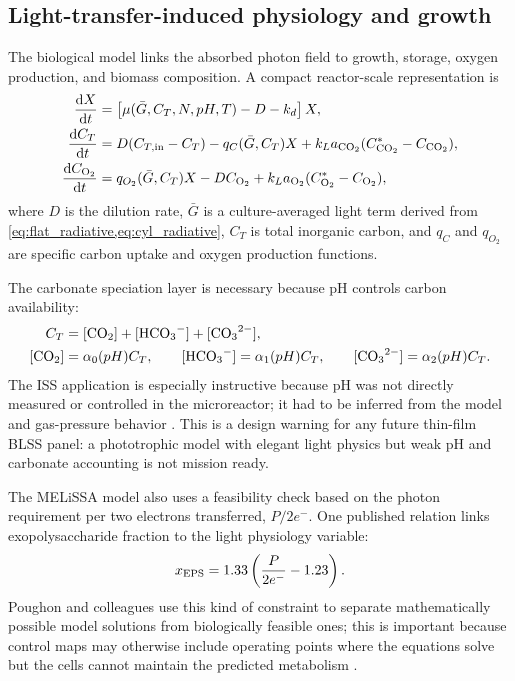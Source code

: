 \documentclass[11pt]{article}
\newcommand{\MEL}{MELiSSA}
\newcommand{\dd}{\mathrm{d}}
\begin{document}
\subsection{Light-transfer-induced physiology and growth}

The biological model links the absorbed photon field to growth, storage, oxygen production, and biomass composition. A compact reactor-scale representation is
\begin{align}
  \frac{\dd X}{\dd t} &= \left[\mu(\bar G,C_T,N,pH,T)-D-k_d\right]X,\label{eq:c4a_biomass}\\
  \frac{\dd C_T}{\dd t} &=D(C_{T,\rm in}-C_T)-q_C(\bar G,C_T)X+k_La_{\ce{CO2}}(C^*_{\ce{CO2}}-C_{\ce{CO2}}),\label{eq:c4a_carbon}\\
  \frac{\dd C_{\ce{O2}}}{\dd t} &=q_{O_2}(\bar G,C_T)X-D C_{\ce{O2}}+k_La_{\ce{O2}}(C^*_{\ce{O2}}-C_{\ce{O2}}),\label{eq:c4a_oxygen}
\end{align}
where $D$ is the dilution rate, $\bar G$ is a culture-averaged light term derived from \cref{eq:flat_radiative,eq:cyl_radiative}, $C_T$ is total inorganic carbon, and $q_C$ and $q_{O_2}$ are specific carbon uptake and oxygen production functions.

The carbonate speciation layer is necessary because pH controls carbon availability:
\begin{align}
C_T&=[\ce{CO2}]+[\ce{HCO3-}]+[\ce{CO3^{2-}}],\label{eq:tic}\\
[\ce{CO2}]&=\alpha_0(pH)C_T,
\qquad [\ce{HCO3-}]=\alpha_1(pH)C_T,
\qquad [\ce{CO3^{2-}}]=\alpha_2(pH)C_T.
\end{align}
The ISS application is especially instructive because pH was not directly measured or controlled in the microreactor; it had to be inferred from the model and gas-pressure behavior \parencite[8--9]{poughon2021}. This is a design warning for any future thin-film BLSS panel: a phototrophic model with elegant light physics but weak pH and carbonate accounting is not mission ready.

The \MEL{} model also uses a feasibility check based on the photon requirement per two electrons transferred, $P/2e^-$. One published relation links exopolysaccharide fraction to the light physiology variable:
\begin{equation}
  x_{\rm EPS}=1.33\left(\frac{P}{2e^-}-1.23\right).
  \label{eq:eps_photon}
\end{equation}
Poughon and colleagues use this kind of constraint to separate mathematically possible model solutions from biologically feasible ones; this is important because control maps may otherwise include operating points where the equations solve but the cells cannot maintain the predicted metabolism \parencite[2, 4]{poughon2021}.
\end{document}
